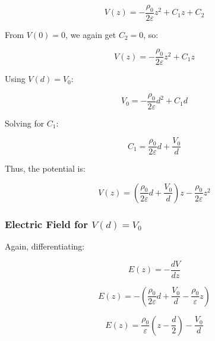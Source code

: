 \documentclass[a4paper,12pt]{article}
\begin{document}
\begin{equation}
V(z) = -\frac{\rho_0}{2\varepsilon} z^2 + C_1 z + C_2
\end{equation}

From \( V(0) = 0 \), we again get \( C_2 = 0 \), so:

\begin{equation}
V(z) = -\frac{\rho_0}{2\varepsilon} z^2 + C_1 z
\end{equation}

Using \( V(d) = V_0 \):

\begin{equation}
V_0 = -\frac{\rho_0}{2\varepsilon} d^2 + C_1 d
\end{equation}

Solving for \( C_1 \):

\begin{equation}
C_1 = \frac{\rho_0}{2\varepsilon} d + \frac{V_0}{d}
\end{equation}

Thus, the potential is:

\begin{equation}
\boxed{V(z) = \left( \frac{\rho_0}{2\varepsilon} d + \frac{V_0}{d} \right) z - \frac{\rho_0}{2\varepsilon} z^2}
\end{equation}

\subsubsection{Electric Field for \( V(d) = V_0 \)}

Again, differentiating:

\begin{equation}
E(z) = -\frac{dV}{dz}
\end{equation}

\begin{equation}
E(z) = - \left( \frac{\rho_0}{2\varepsilon} d + \frac{V_0}{d} - \frac{\rho_0}{\varepsilon} z \right)
\end{equation}

\begin{equation}
\boxed{E(z) = \frac{\rho_0}{\varepsilon} \left( z - \frac{d}{2} \right) - \frac{V_0}{d}}
\end{equation}
\end{document}
